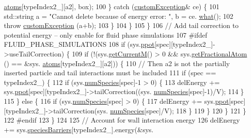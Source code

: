 \begin{DoxyCode}
      \hyperlink{classsim_system_a90421b19082f7fb8fc23b7264b1161e4}{atoms}[typeIndex2\_][a2], box);
100                 \} \textcolor{keywordflow}{catch} (\hyperlink{classcustom_exception}{customException}& ce) \{
101                     std::string a = \textcolor{stringliteral}{"Cannot delete because of energy error: "}, b = ce.
      \hyperlink{classcustom_exception_aeb6ab5848b038adfc68fde86a512f691}{what}();
102                     \textcolor{keywordflow}{throw} \hyperlink{classcustom_exception}{customException} (a+b);
103                 \}
104             \}
105         \}
106         \textcolor{comment}{// Add tail correction to potential energy -- only enable for fluid phase simulations}
107 \textcolor{preprocessor}{#ifdef FLUID\_PHASE\_SIMULATIONS}
108 \textcolor{preprocessor}{}        \textcolor{keywordflow}{if} (sys.\hyperlink{classsim_system_ad2e290b5963f132e6a3a56cee35c8e9f}{ppot}[spec][typeIndex2\_]->useTailCorrection) \{
109             \textcolor{keywordflow}{if} (!(sys.\hyperlink{classsim_system_a299fe4372e610b554eaaf5f5957b2dbc}{getCurrentM}() > 0 && sys.\hyperlink{classsim_system_a2ab77377c60e0e3109a6e875690b0ab7}{getFractionalAtom} () == &sys.
      \hyperlink{classsim_system_a90421b19082f7fb8fc23b7264b1161e4}{atoms}[typeIndex2\_][a2])) \{
110                 \textcolor{comment}{// Then a2 is not the partially inserted particle and tail interactions must be included}
111                 \textcolor{keywordflow}{if} (spec == typeIndex2\_) \{
112                     \textcolor{keywordflow}{if} (sys.\hyperlink{classsim_system_a9eea865e6dc1cff377b1e79c4d9c23f0}{numSpecies}[spec]-1 > 0) \{
113                         delEnergy += sys.\hyperlink{classsim_system_ad2e290b5963f132e6a3a56cee35c8e9f}{ppot}[spec][typeIndex2\_]->tailCorrection((sys.
      \hyperlink{classsim_system_a9eea865e6dc1cff377b1e79c4d9c23f0}{numSpecies}[spec]-1)/V);
114                     \}
115                 \} \textcolor{keywordflow}{else} \{
116                     \textcolor{keywordflow}{if} (sys.\hyperlink{classsim_system_a9eea865e6dc1cff377b1e79c4d9c23f0}{numSpecies}[spec] > 0) \{
117                         delEnergy += sys.\hyperlink{classsim_system_ad2e290b5963f132e6a3a56cee35c8e9f}{ppot}[spec][typeIndex2\_]->tailCorrection(sys.
      \hyperlink{classsim_system_a9eea865e6dc1cff377b1e79c4d9c23f0}{numSpecies}[spec]/V);
118                     \}
119                 \}
120             \}
121         \}
122 \textcolor{preprocessor}{#endif}
123 \textcolor{preprocessor}{}    \}
124 
125     \textcolor{comment}{// Account for wall interaction energy}
126     delEnergy += sys.\hyperlink{classsim_system_a5ae652ff4519f39c3862abae32a9581b}{speciesBarriers}[typeIndex2\_].energy(&sys.

\end{DoxyCode}
